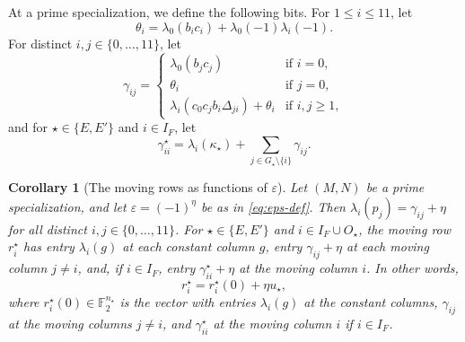 \documentclass[12pt,oneside,openany]{book}
\theoremstyle{definition}
\theoremstyle{plain}
\numberwithin{equation}{chapter}
\theoremstyle{plain}
\newtheorem{corollary}[corollary]{Corollary}
\theoremstyle{definition}
\theoremstyle{remark}
\newcommand{\F}{\mathbb F}
\newcommand{\eps}{\varepsilon}
\begin{document}
At a prime specialization, we define the following bits. For $1\le i\le11$, let
\begin{equation}\label{eq:theta}
\theta_i=\lambda_0(b_ic_i)+\lambda_0(-1)\lambda_i(-1).
\end{equation}
For distinct $i,j\in\{0,\dots,11\}$, let
\begin{equation}\label{eq:gamma}
\gamma_{ij}=\begin{cases}
\lambda_0(b_jc_j)&\text{if }i=0,\\
\theta_i&\text{if }j=0,\\
\lambda_i(c_0c_jb_i\Delta_{ji})+\theta_i&\text{if }i,j\ge1,
\end{cases}
\end{equation}
and for $\star\in\{E,E'\}$ and $i\in I_F$, let
\begin{equation}\label{eq:gamma-diagonal}
\gamma^\star_{ii}=\lambda_i(\kappa_\star)+\sum_{j\in G_\star\setminus\{i\}}\gamma_{ij}.
\end{equation}

\begin{corollary}[The moving rows as functions of $\eps$]\label{cor:eta-structure}
Let $(M,N)$ be a prime specialization, and let $\eps=(-1)^\eta$ be as in \eqref{eq:eps-def}. Then $\lambda_i(p_j)=\gamma_{ij}+\eta$ for all distinct $i,j\in\{0,\dots,11\}$. For $\star\in\{E,E'\}$ and $i\in I_F\cup O_\star$, the moving row $r^\star_i$ has entry $\lambda_i(g)$ at each constant column $g$, entry $\gamma_{ij}+\eta$ at each moving column $j\ne i$, and, if $i\in I_F$, entry $\gamma^\star_{ii}+\eta$ at the moving column $i$. In other words,
\begin{equation}\label{eq:eta-structure}
r^\star_i=r^\star_i(0)+\eta u_\star,
\end{equation}
where $r^\star_i(0)\in\F_2^{n_\star}$ is the vector with entries $\lambda_i(g)$ at the constant columns, $\gamma_{ij}$ at the moving columns $j\ne i$, and $\gamma^\star_{ii}$ at the moving column $i$ if $i\in I_F$.
\end{corollary}
\end{document}
